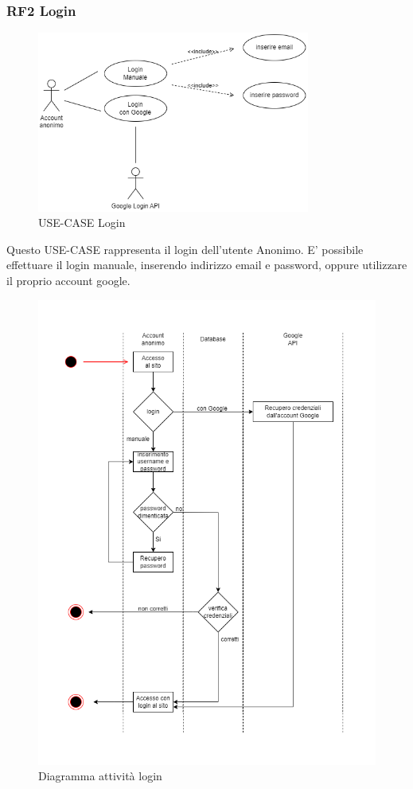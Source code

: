 \documentclass[a4paper,12pt]{article}
\begin{document}
\subsubsection*{RF2 Login}
\begin{figure}[H]
   \centering
   \includegraphics[width=0.8\textwidth]{img/login_anonimo.png}
    \caption{USE-CASE Login}
\end{figure}

Questo USE-CASE rappresenta il login dell'utente Anonimo.
E' possibile effettuare il login manuale, inserendo indirizzo email e password, oppure utilizzare il proprio account google.

\begin{figure}[H]
   \centering
    \includegraphics[width=1\textwidth]{img/diagramma_login.png}
    \caption{ Diagramma attività login}
\end{figure}
\end{document}
